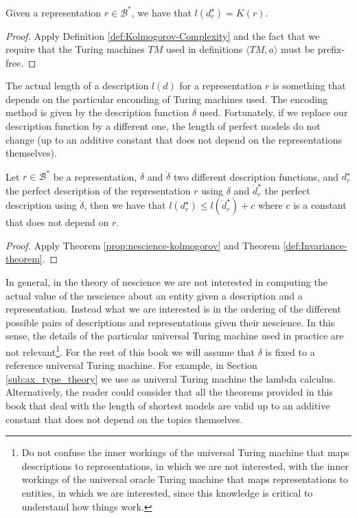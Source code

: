 \begin{proposition}
\label{prop:nescience-kolmogorov}
Given a representation $r \in \mathcal{B}^\ast$, we have that $l \left( d_r^{\star} \right) = K\left( r \right)$.
\end{proposition}
\begin{proof}
Apply Definition \ref{def:Kolmogorov-Complexity} and the fact that we require that the Turing machines $TM$ used in definitions $\langle TM,a\rangle$ must be prefix-free.
\end{proof}

The actual length of a description $l \left( d \right)$ for a representation $r$ is something that depends on the particular enconding of Turing machines used. The encoding method is given by the description function $\delta$ used. Fortunately, if we replace our description function by a different one, the length of perfect models do not change (up to an additive constant that does not depend on the representations themselves).

\begin{corollary}
Let $r \in \mathcal{B}^\ast$ be a representation, $\delta$ and $\dot{\delta}$ two different description functions, and $d_r^{\star}$ the perfect description of the representation $r$ using $\delta$ and $\dot{d}_r^{\star}$ the perfect description using $\dot{\delta}$, then we have that $l \left( d_r^{\star} \right) \leq l \left( \dot{d}_r^{\star} \right) + c$ where $c$ is a constant that does not depend on $r$.
\end{corollary}
\begin{proof}
Apply Theorem \ref{prop:nescience-kolmogorov} and Theorem \ref{def:Invariance-theorem}.
\end{proof}

In general, in the theory of nescience we are not interested in computing the actual value of the nescience about an entity given a description and a representation. Instead what we are interested is in the ordering of the different possible pairs of descriptions and representations given their nescience. In this sense, the details of the particular universal Turing machine used in practice are not relevant\footnote{Do not confuse the inner workings of the universal Turing machine that maps descriptions to representations, in which we are not interested, with the inner workings of the universal oracle Turing machine that maps representations to entities, in which we are interested, since this knowledge is critical to understand how things work.}. For the rest of this book we will assume that $\delta$ is fixed to a reference universal Turing machine. For example, in Section \ref{sub:ax_type_theory} we use as univeral Turing machine the lambda calculus. Alternatively, the reader could consider that all the theorems provided in this book that deal with the length of shortest models are valid up to an additive constant that does not depend on the topics themselves.

